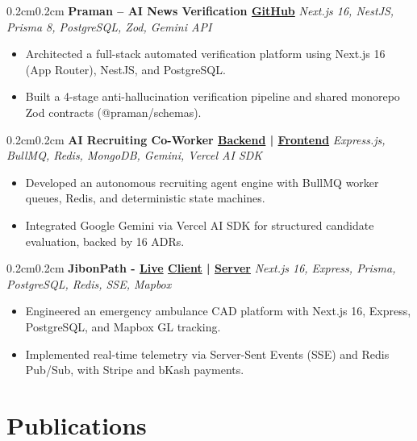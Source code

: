 \documentclass[10pt, a4paper]{article}
\newenvironment{highlights}{\begin{itemize}[topsep=0.03cm, parsep=0.03cm, partopsep=0pt, itemsep=0pt, leftmargin=10pt]}{\end{itemize}}
\newenvironment{onecolentry}{\begin{adjustwidth}{0.2cm}{0.2cm}}{\end{adjustwidth}}
\begin{document}
\begin{onecolentry}
\textbf{Praman -- AI News Verification \quad \href{https://github.com/mrshanshuvo/praman}{GitHub}} \hfill \textit{Next.js 16, NestJS, Prisma 8, PostgreSQL, Zod, Gemini API}
\begin{highlights}
\item Architected a full-stack automated verification platform using Next.js 16 (App Router), NestJS, and PostgreSQL.
\item Built a 4-stage anti-hallucination verification pipeline and shared monorepo Zod contracts (@praman/schemas).
\end{highlights}
\end{onecolentry}

\begin{onecolentry}
\textbf{AI Recruiting Co-Worker \quad \href{https://github.com/mrshanshuvo/ai-recruiting-backend}{Backend} \;|\; \href{https://github.com/mrshanshuvo/ai-recruiting-frontend}{Frontend}} \hfill \textit{Express.js, BullMQ, Redis, MongoDB, Gemini, Vercel AI SDK}
\begin{highlights}
\item Developed an autonomous recruiting agent engine with BullMQ worker queues, Redis, and deterministic state machines.
\item Integrated Google Gemini via Vercel AI SDK for structured candidate evaluation, backed by 16 ADRs.
\end{highlights}
\end{onecolentry}

\begin{onecolentry}
\textbf{JibonPath - \href{https://jibonpath.vercel.app}{Live} \quad \href{https://github.com/mrshanshuvo/jibonpath-frontend}{Client} \;|\; \href{https://github.com/mrshanshuvo/jibonpath-backend}{Server}} \hfill \textit{Next.js 16, Express, Prisma, PostgreSQL, Redis, SSE, Mapbox}
\begin{highlights}
\item Engineered an emergency ambulance CAD platform with Next.js 16, Express, PostgreSQL, and Mapbox GL tracking.
\item Implemented real-time telemetry via Server-Sent Events (SSE) and Redis Pub/Sub, with Stripe and bKash payments.
\end{highlights}
\end{onecolentry}

\section{Publications}
\end{document}
